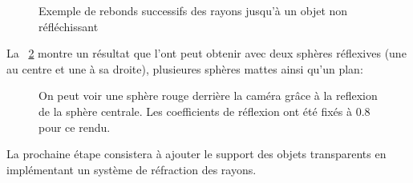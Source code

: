\documentclass[11pt]{article}
\begin{document}
\begin{figure}[!h]

	\caption{Exemple de rebonds successifs des rayons jusqu'à un objet non réfléchissant}
	\label{reflectionsSchema}
\end{figure}
\FloatBarrier

La \figurename\ \ref{reflectionsDemo} montre un résultat que l'ont peut obtenir avec deux sphères réflexives (une au centre et une à sa droite), plusieures sphères mattes ainsi qu'un plan:

\begin{figure}[h!]

	\caption{On peut voir une sphère rouge derrière la caméra grâce à la reflexion de la sphère centrale. Les coefficients de réflexion ont été fixés à 0.8 pour ce rendu.}
	\label{reflectionsDemo}
\end{figure}
\FloatBarrier

La prochaine étape consistera à ajouter le support des objets transparents en implémentant un système de réfraction des rayons.
\end{document}
